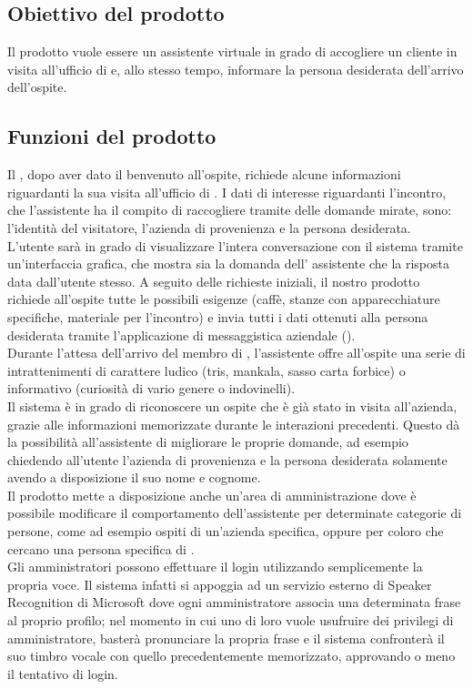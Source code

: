 \subsection{Obiettivo del prodotto}
Il prodotto vuole essere un assistente virtuale in grado di accogliere un cliente in visita all'ufficio di \PROPONENTE{} e, allo stesso tempo, informare la persona desiderata dell'arrivo dell'ospite. 
\subsection{Funzioni del prodotto}
Il , dopo aver dato il benvenuto all'ospite, richiede alcune informazioni riguardanti la sua visita all'ufficio di \PROPONENTE. I dati di interesse riguardanti l'incontro, che l'assistente ha il compito di raccogliere tramite delle domande mirate, sono: l'identità del visitatore, l'azienda di provenienza e la persona desiderata.\\
L'utente sarà in grado di visualizzare l'intera conversazione con il sistema tramite un'interfaccia grafica, che mostra sia la domanda dell' assistente che la risposta data dall'utente stesso.
A seguito delle richieste iniziali, il nostro prodotto richiede all'ospite tutte le possibili esigenze (caffè, stanze con apparecchiature specifiche, materiale per l'incontro) e invia tutti i dati ottenuti alla persona desiderata tramite l'applicazione di messaggistica aziendale ().\\
Durante l'attesa dell'arrivo del membro di \PROPONENTE{}, l'assistente offre all'ospite una serie di intrattenimenti di carattere ludico (tris, mankala, sasso carta forbice) o informativo (curiosità di vario genere o indovinelli).\\
Il sistema è in grado di riconoscere un ospite che è già stato in visita all'azienda, grazie alle informazioni memorizzate durante le interazioni precedenti. Questo dà la possibilità all'assistente di migliorare le proprie domande, ad esempio chiedendo all'utente l'azienda di provenienza e la persona desiderata solamente avendo a disposizione il suo nome e cognome.\\
Il prodotto mette a disposizione anche un'area di amministrazione dove è possibile modificare il comportamento dell'assistente per determinate categorie di persone, come ad esempio ospiti di un'azienda specifica, oppure per coloro che cercano una persona specifica di \PROPONENTE{}. \\
Gli amministratori possono effettuare il login utilizzando semplicemente la propria voce. Il sistema infatti si appoggia ad un servizio esterno di Speaker Recognition di Microsoft dove ogni amministratore associa una determinata frase al proprio profilo; nel momento in cui uno di loro vuole usufruire dei privilegi di amministratore, basterà pronunciare la propria frase e il sistema confronterà il suo timbro vocale con quello precedentemente memorizzato, approvando o meno il tentativo di login.
